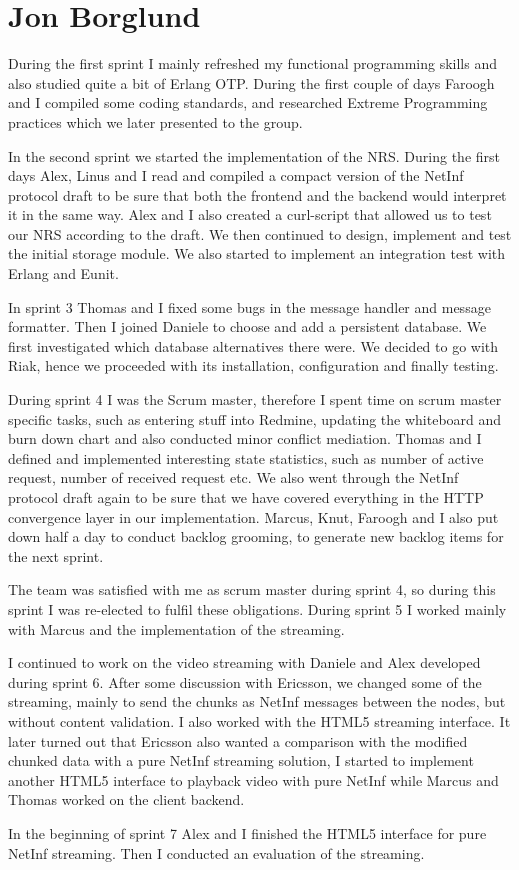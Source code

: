 \section{Jon Borglund}
During the first sprint I mainly refreshed my functional programming skills and also studied quite a bit of Erlang OTP.
During the first couple of days Faroogh and I compiled some coding standards, and researched Extreme Programming practices which we later presented to the group.

In the second sprint we started the implementation of the NRS. During the first days Alex, Linus and I read and compiled a compact version of the NetInf protocol draft to be sure that both the frontend and the backend would interpret it in the same way. Alex and I also created a curl-script that allowed us to test our NRS according to the draft. 
We then continued to design, implement and test the initial storage module. 
We also started to implement an integration test with Erlang and Eunit.

In sprint 3 Thomas and I fixed some bugs in the message handler and message formatter. Then I joined Daniele to choose and add a persistent database. We first investigated which database alternatives there were. We decided to go with Riak, hence we proceeded with its installation, configuration and finally testing.

During sprint 4 I was the Scrum master, therefore I spent time on scrum master specific tasks, such as entering stuff into Redmine, updating the whiteboard and burn down chart and also conducted minor conflict mediation. 
Thomas and I defined and implemented interesting state statistics, such as number of active request, number of received request etc. We also went through the NetInf protocol draft again to be sure that we have covered everything in the HTTP convergence layer in our implementation. Marcus, Knut, Faroogh and I also put down half a day to conduct backlog grooming, to generate new backlog items for the next sprint. 

The team was satisfied with me as scrum master during sprint 4, so during this sprint I was re-elected to fulfil these obligations. 
During sprint 5 I worked mainly with Marcus and the implementation of the streaming. 

I continued to work on the video streaming with Daniele and Alex developed during sprint 6. After some discussion with Ericsson, we changed some of the streaming, mainly to send the chunks as NetInf messages between the nodes, but without content validation. I also worked with the HTML5 streaming interface. 
It later turned out that Ericsson also wanted a comparison with the modified chunked data with a pure NetInf streaming solution, I started to implement another HTML5 interface to playback video with pure NetInf while Marcus and Thomas worked on the client backend.

In the beginning of sprint 7 Alex and I finished the HTML5 interface for pure NetInf streaming. Then I conducted an evaluation of the streaming. 
